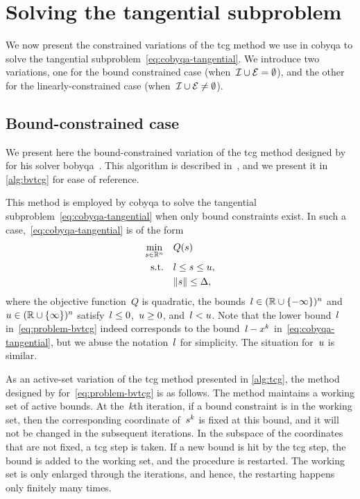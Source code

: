 \section{Solving the tangential subproblem}
\label{sec:cobyqa-tangential}

We now present the constrained variations of the \gls{tcg} method we use in \gls{cobyqa} to solve the tangential subproblem~\cref{eq:cobyqa-tangential}.
We introduce two variations, one for the bound constrained case (when~$\mathcal{I} \cup \mathcal{E} = \emptyset$), and the other for the linearly-constrained case (when~$\mathcal{I} \cup \mathcal{E} \neq \emptyset$).

\subsection{Bound-constrained case}

We present here the bound-constrained variation of the \gls{tcg} method designed by \citeauthor{Powell_2009} for his solver \gls{bobyqa}~\cite{Powell_2009}.
This algorithm is described in~\cite[\S~3]{Powell_2009}, and we present it in \cref{alg:bvtcg} for ease of reference.

This method is employed by \gls{cobyqa} to solve the tangential subproblem~\cref{eq:cobyqa-tangential} when only bound constraints exist.
In such a case,~\cref{eq:cobyqa-tangential} is of the form
\begin{subequations}
    \label{eq:problem-bvtcg}
    \begin{align}
        \min_{\sstep \in \R^n}  & \quad Q(\sstep) \label{eq:problem-bvtcg-obj}\\
        \text{s.t.}             & \quad \xl \le \sstep \le \xu,\\
                                & \quad \norm{\sstep} \le \rad,
    \end{align}
\end{subequations}
where the objective function~$Q$ is quadratic, the bounds~$l \in (\mathbb{R} \cup \{-\infty\})^n$ and~$u \in (\mathbb{R} \cup \{\infty\})^n$ satisfy~$l \le 0$,~$u \ge 0$, and~$l < u$.
Note that the lower bound~$l$ in~\cref{eq:problem-bvtcg} indeed corresponds to the bound~$\xl - \iter[k]$ in~\cref{eq:cobyqa-tangential}, but we abuse the notation~$l$ for simplicity.
The situation for~$u$ is similar.

As an active-set variation of the \gls{tcg} method presented in \cref{alg:tcg}, the method designed by \citeauthor{Powell_2009} for~\cref{eq:problem-bvtcg} is as follows.
The method maintains a working set of active bounds.
At the~$k$th iteration, if a bound constraint is in the working set, then the corresponding coordinate of~$\sstep[k]$ is fixed at this bound, and it will not be changed in the subsequent iterations.
In the subspace of the coordinates that are not fixed, a \gls{tcg} step is taken.
If a new bound is hit by the \gls{tcg} step, the bound is added to the working set, and the procedure is restarted.
The working set is only enlarged through the iterations, and hence, the restarting happens only finitely many times.

